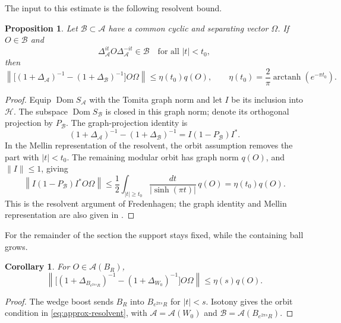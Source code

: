 \documentclass[a4paper,11pt]{article}
\newtheorem{corollary}[theorem]{Corollary}
\newtheorem{proposition}[theorem]{Proposition}
\theoremstyle{definition}
\begin{document}
The input to this estimate is the following resolvent bound.
\begin{proposition}
Let $\mathcal B\subset\mathcal A$ have a common cyclic and separating vector $\Omega$. If $O\in\mathcal B$ and
\[
 \Delta_\mathcal A^{it}O\Delta_\mathcal A^{-it}\in\mathcal B
 \quad\text{for all }|t|<t_0,
\]
then
\begin{equation}
 \left\|\bigl[(1+\Delta_\mathcal A)^{-1}
 -(1+\Delta_\mathcal B)^{-1}\bigr]O\Omega\right\|
 \leq\eta(t_0)q(O),
 \qquad \eta(t_0)=\frac2\pi\operatorname{arctanh}(e^{-\pi t_0}).
 \label{eq:approx-resolvent}
\end{equation}
\end{proposition}
\begin{proof}
Equip $\operatorname{Dom}S_\mathcal A$ with the Tomita graph norm and let $I$ be its inclusion into $\mathcal H$. The subspace $\operatorname{Dom}S_\mathcal B$ is closed in this graph norm; denote its orthogonal projection by $P_\mathcal B$. The graph-projection identity is
\[
 (1+\Delta_\mathcal A)^{-1}-(1+\Delta_\mathcal B)^{-1}
 =I(1-P_\mathcal B)I^*.
\]
In the Mellin representation of the resolvent, the orbit assumption removes the part with $|t|<t_0$. The remaining modular orbit has graph norm $q(O)$, and $\|I\|\leq1$, giving
\[
 \left\|I(1-P_\mathcal B)I^*O\Omega\right\|
 \leq\frac12\int_{|t|\geq t_0}\frac{dt}{|\sinh(\pi t)|}\,q(O)
 =\eta(t_0)q(O).
\]
This is the resolvent argument of Fredenhagen; the graph identity and Mellin representation are also given in \cite[Section~3]{Hollands2019Edge}.
\end{proof}

For the remainder of the section the support stays fixed, while the containing ball grows.
\begin{corollary}
For $O\in\mathcal A(B_R)$,
\begin{equation}
 \left\|\bigl[(1+\Delta_{B_{e^{2\pi s}R}})^{-1}
 -(1+\Delta_{W_0})^{-1}\bigr]O\Omega\right\|
 \leq\eta(s)q(O).
 \label{eq:approx-growing-resolvent}
\end{equation}
\end{corollary}
\begin{proof}
The wedge boost sends $B_R$ into $B_{e^{2\pi s}R}$ for $|t|<s$. Isotony gives the orbit condition in \eqref{eq:approx-resolvent}, with $\mathcal A=\mathcal A(W_0)$ and $\mathcal B=\mathcal A(B_{e^{2\pi s}R})$.
\end{proof}
\end{document}
